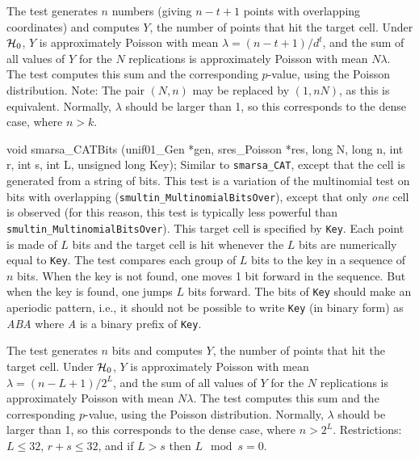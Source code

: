  The test generates $n$ numbers (giving $n-t+1$ points with overlapping
 coordinates) and computes $Y$, the number of points that hit the target
  cell. Under $\mathcal{H}_0$, $Y$ is approximately Poisson with mean
 $\lambda = (n-t+1)/d^t$,
 and the sum of all values of $Y$ for the
 $N$ replications is approximately Poisson with mean $N\lambda$.
 The test computes this sum and the corresponding $p$-value,
 using the Poisson distribution.
 Note: The pair $(N,n)$ may be replaced by $(1, nN)$, as this is equivalent.
 Normally, $\lambda$ should be larger than 1,
 so this corresponds to the dense case, where $n > k$.
 \endtab
\code


void smarsa_CATBits (unif01_Gen *gen, sres_Poisson *res, long N, long n,
                     int r, int s, int L, unsigned long Key);
\endcode
\tab
  Similar to {\tt smarsa\_CAT}, except that the cell is generated
  from a string of bits.
 This test is a variation of the multinomial test on bits with overlapping
 ({\tt smultin\_MultinomialBitsOver}), except that only {\em one\/} cell is
 observed (for this reason, this test is typically less powerful than
 {\tt smultin\_MultinomialBitsOver}).
 This target cell is specified by {\tt Key}.
 Each point is made of $L$ bits and the target cell is hit
 whenever the $L$ bits are numerically equal to {\tt Key}.
 The test compares each group of $L$ bits to the key in a sequence of
 $n$ bits. When the key is not found, one moves 1 bit forward
  in the sequence. But when the key is found, one jumps $L$ bits forward.
 The bits of {\tt Key}
 should make an aperiodic pattern, i.e., it should not
 be possible to write {\tt Key} (in binary form) as {\em ABA} where
 {\em A} is a binary prefix of  {\tt Key}.

 The test generates $n$ bits and computes $Y$, the number of points
 that hit the target cell.
 Under $\mathcal{H}_0$, $Y$ is approximately Poisson with mean
 $\lambda = (n-L+1)/2^L$, and the sum of all values of $Y$ for the
 $N$ replications is approximately Poisson with mean $N\lambda$.
 The test computes this sum and the corresponding $p$-value,
 using the Poisson distribution.
 Normally, $\lambda$ should be larger than 1,
 so this corresponds to the dense case, where $n > 2^L$.
 Restrictions: $L \le 32$, $r+s \le 32$, and if $L > s$ then $L \mod s = 0$.
 \endtab
\code


